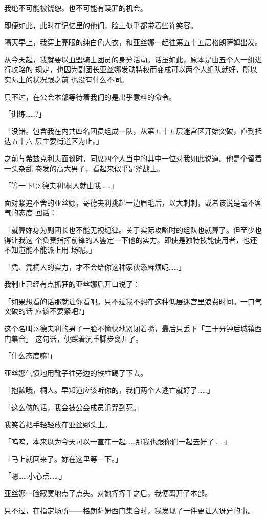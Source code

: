 \documentclass[11pt]{book}
\begin{document}
我绝不可能被饶恕。也不可能有赎罪的机会。

即便如此，此时在记忆里的他们，脸上似乎都带着些许笑容。

隔天早上，我穿上亮眼的纯白色大衣，和亚丝娜一起往第五十五层格朗萨姆出发。

从今天起，我就要以血盟骑士团员的身分活动。话虽如此，原本是由五个人一组进行攻略的
规定，也因为副团长亚丝娜发动特权而变成可以两个人组队就好，所以实际上的状况跟之前
也没有什么不同。

只不过，在公会本部等待着我们的是出乎意料的命令。

「训练……?」

「没错。包含我在内共四名团员组成一队，从第五十五层迷宫区开始突破，直到抵达五十六
层主要街道区为止。」

之前与希兹克利夫面谈时，同席四个人当中的其中一位对我如此说道。他是个留着一头杂乱
卷发的高大男子，看起来似乎是斧战士。

「等一下!哥德夫利!桐人就由我……」

面对紧追不舍的亚丝娜，哥德夫利挑起一边眉毛后，以大刺刺，或者该说是毫不客气的态度
回话：

「就算妳身为副团长也不能无视纪律。关于实际攻略时的组队也就算了。但至少也得让我这
个负责指挥前锋的人鉴定一下他的实力。即使是独特技能使用者，也还不知道能不能派上用
场呢。」

「凭、凭桐人的实力，才不会给你这种家伙添麻烦呢……」

我制止已经有点抓狂的亚丝娜后开口说了：

「如果想看的话那就让你看吧。只不过我不想在这种低层迷宫里浪费时间。一口气突破的话
应该不要紧吧?」

这个名叫哥德夫利的男子一脸不愉快地紧闭着嘴，最后只丢下「三十分钟后城镇西门集合」
这句话，便踩着沉重脚步离开了。

「什么态度嘛!」

亚丝娜气愤地用靴子往旁边的铁柱踢了下去。

「抱歉哦，桐人。早知道应该听你的，我们两个人逃亡就好了……」

「这么做的话，我会被公会成员诅咒到死。」

我笑着把手轻轻放在亚丝娜头上。

「呜呜，本来以为今天可以一直在一起……那我也跟你们一起去好了……」

「马上就回来了。妳在这里等一下。」

「嗯……小心点……」

亚丝娜一脸寂寞地点了点头。对她挥挥手之后，我便离开了本部。

只不过，在指定场所——格朗萨姆西门集合时，我发现了一件更让人讶异的事。
\end{document}
